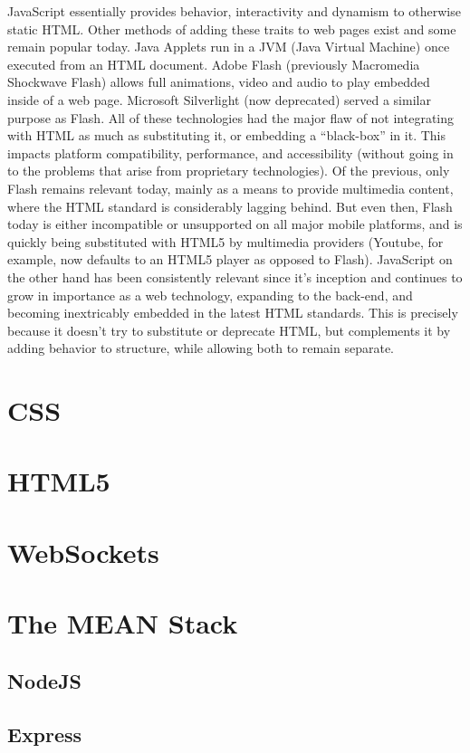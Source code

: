 JavaScript essentially provides behavior, interactivity and dynamism to otherwise static HTML. Other methods of adding
these traits to web pages exist and some remain popular today. Java Applets run in a JVM (Java Virtual Machine) once
executed from an HTML document. Adobe Flash (previously Macromedia Shockwave Flash) allows full animations, video and
audio to play embedded inside of a web page. Microsoft Silverlight (now deprecated) served a similar purpose as Flash.
All of these technologies had the major flaw of not integrating with HTML as much as substituting it, or embedding a
``black-box'' in it. This impacts platform compatibility, performance, and accessibility (without going in to the
problems that arise from proprietary technologies). Of the previous, only Flash remains relevant today, mainly as a means
to provide multimedia content, where the HTML standard is considerably lagging behind. But even then, Flash today is
either incompatible or unsupported on all major mobile platforms, and is quickly being substituted with HTML5 by
multimedia providers (Youtube, for example, now defaults to an HTML5 player as opposed to Flash). JavaScript on the other
hand has been consistently relevant since it's inception and continues to grow in importance as a web technology,
expanding to the back-end, and becoming inextricably embedded in the latest HTML standards. This is precisely because it
doesn't try to substitute or deprecate HTML, but complements it by adding behavior to structure, while allowing both to
remain separate.
\section{CSS}
\section{HTML5} \label{HTML5}
\section{WebSockets}
\section{The MEAN Stack} \label{TheMEANStack}
\subsection{NodeJS}
\subsection{Express}
